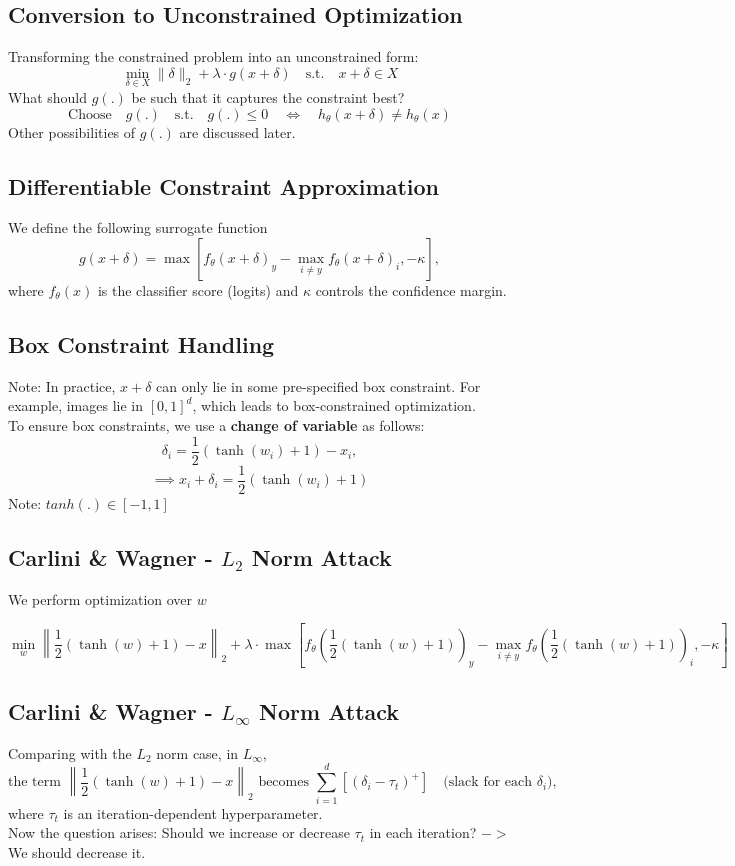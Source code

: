 \documentclass[11pt]{report}
\begin{document}
\subsection*{Conversion to Unconstrained Optimization}
Transforming the constrained problem into an unconstrained form:
\[
    \min_{\delta \in X} \|\delta\|_2 + \lambda \cdot g(x + \delta) \quad \text{s.t.} \quad x+\delta \in X
\]
What should $g(.)$ be such that it captures the constraint best?
\[
    \text{Choose} \quad g(.) \quad \text{s.t.} \quad g(.) \leq 0 \quad \iff \quad h_\theta(x+\delta) \neq h_\theta(x)
\]
Other possibilities of $g(.)$ are discussed later.

\subsection*{Differentiable Constraint Approximation}
We define the following surrogate function
\[
    g(x+\delta) = \max[f_\theta(x+\delta)_y - \max_{i \neq y} f_\theta(x+\delta)_i, -\kappa],
\]
where $f_\theta(x)$ is the classifier score (logits) and $\kappa$ controls the confidence margin.

\subsection*{Box Constraint Handling}
Note: In practice, $x+\delta$ can only lie in some pre-specified box constraint. For example, images lie in  $[0,1]^d$, which leads to box-constrained optimization. \\
To ensure box constraints, we use a \textbf{change of variable} as follows:
\[
    \delta_i = \frac{1}{2}(\tanh(w_i) + 1) - x_i,
\]
\[
    \implies x_i + \delta_i = \frac{1}{2}(\tanh(w_i) + 1)
\]
Note: $tanh(.) \in [-1,1]$

\subsection*{Carlini \& Wagner - $L_2$ Norm Attack}

We perform optimization over $w$

\[
    \min_w \left\|\frac{1}{2}(\tanh(w) + 1) - x\right\|_2 + \lambda \cdot \max\left[f_\theta\left(\frac{1}{2}(\tanh(w) + 1)\right)_y - \max_{i \neq y} f_\theta\left(\frac{1}{2}(\tanh(w) + 1)\right)_i, -\kappa\right]
\]

\subsection*{Carlini \& Wagner - $L_\infty$ Norm Attack}
Comparing with the $L_2$ norm case, in $L_\infty$,
\[
    \text{the term } \left\|\frac{1}{2}(\tanh(w) + 1) - x\right\|_2 \text{ becomes } \sum_{i=1}^d [(\delta_i-\tau_t)^+] \quad \text{(slack for each $\delta_i$)},
\]
where $\tau_t$ is an iteration-dependent hyperparameter. \\
Now the question arises: Should we increase or decrease $\tau_t$ in each iteration? $->$ We should decrease it.
\end{document}
